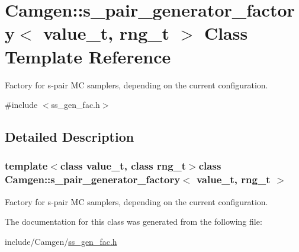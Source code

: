 \hypertarget{a00496}{}\section{Camgen\+:\+:s\+\_\+pair\+\_\+generator\+\_\+factory$<$ value\+\_\+t, rng\+\_\+t $>$ Class Template Reference}
\label{a00496}


Factory for s-\/pair M\+C samplers, depending on the current configuration.  




{\ttfamily \#include $<$ss\+\_\+gen\+\_\+fac.\+h$>$}



\subsection{Detailed Description}
\subsubsection*{template$<$class value\+\_\+t, class rng\+\_\+t$>$class Camgen\+::s\+\_\+pair\+\_\+generator\+\_\+factory$<$ value\+\_\+t, rng\+\_\+t $>$}

Factory for s-\/pair M\+C samplers, depending on the current configuration. 

The documentation for this class was generated from the following file\+:\begin{DoxyCompactItemize}
\item 
include/\+Camgen/\hyperlink{a00786}{ss\+\_\+gen\+\_\+fac.\+h}\end{DoxyCompactItemize}
